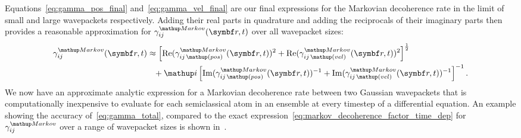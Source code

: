 Equations~\eqref{eq:gamma_pos_final} and~\eqref{eq:gamma_vel_final} are our final expressions for the Markovian decoherence rate in the limit of small and large wavepackets respectively. Adding their real parts in quadrature and adding the reciprocals of their imaginary parts then provides a reasonable approximation for $\gamma_{ij}^\up{Markov}(\vec r, t)$ over all wavepacket sizes:
\begin{align}
\gamma_{ij}^\up{Markov}(\vec r, t) &\approx
\left[\re(\gamma_{ij\,\up{(pos)}}^\up{Markov}(\vec r, t))^2 + \re(\gamma_{ij\,\up{(vel)}}^\up{Markov}(\vec r, t))^2\right]^{\frac12}\nonumber\\
&\phantom{\approx}+ \ii\left[\im(\gamma_{ij\,\up{(pos)}}^\up{Markov}(\vec r, t))^{-1} + \im(\gamma_{ij\,\up{(vel)}}^\up{Markov}(\vec r, t))^{-1}\right]^{-1}.
\label{eq:gamma_total}
\end{align}
We now have an approximate analytic expression for a Markovian decoherence rate between two Gaussian wavepackets that is computationally inexpensive to evaluate for each semiclassical atom in an ensemble at every timestep of a differential equation.
An example showing the accuracy of~\eqref{eq:gamma_total}, compared to the exact expression~\eqref{eq:markov_decoherence_factor_time_dep} for $\gamma_{ij}^\up{Markov}$ over a range of wavepacket sizes is shown in~.

